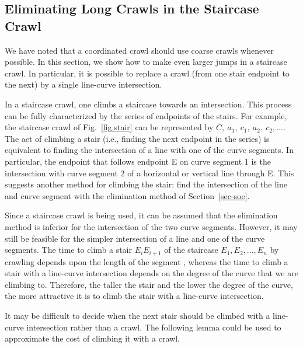 \subsection{Eliminating Long Crawls in the Staircase Crawl}
\label{sub-linecurve}

We have noted that a coordinated crawl should use coarse crawls whenever possible.
In this section, we show how to make even larger jumps in a staircase crawl.
In particular, it is possible to replace a crawl (from one stair endpoint to the next)
by a single line-curve intersection.

In a staircase crawl, one climbs a staircase towards an intersection.
This process can be fully characterized by the series of endpoints of the stairs.
For example, the staircase crawl of Fig.~\ref{fig.stair} can be represented by 
$C,\ a_{1},\ c_{1},\ a_{2},\ c_{2}, \ldots$.
The act of climbing a stair (i.e., finding the next endpoint in the series)
is equivalent to finding the intersection of a line with one of the curve segments.
In particular, the endpoint that follows endpoint E on curve segment 1 is the intersection 
with curve segment 2 of a horizontal or vertical line through E.
This suggests another method for climbing the stair: 
find the intersection of the line and curve segment
with the elimination method of Section~\ref{sec-soe}.

Since a staircase crawl is being used, it can be assumed that
the elimination method is inferior
for the intersection of the two curve segments.
However, it may still be feasible for the simpler intersection of a line and one of 
the curve segments.
The time to climb a stair $E_{i}E_{i+1}$ of the staircase $E_{1},E_{2},\ldots,E_{n}$
by crawling depends upon the length of the segment , 
whereas the time to climb a stair with a line-curve intersection depends on the degree 
of the curve that we are climbing to.
Therefore, the taller the stair and the lower the degree of the curve,
the more attractive it is to climb the stair with a line-curve intersection.

It may be difficult to decide when the next stair should be climbed with a line-curve intersection
rather than a crawl.
The following lemma could be used to approximate the cost of climbing it with a crawl.

